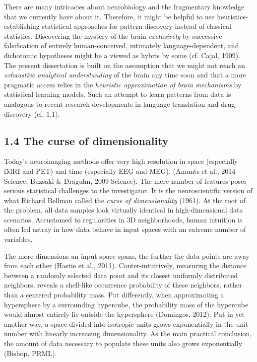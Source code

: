 \documentclass[authoryear,review,3p]{elsarticle}
\begin{document}
There are many intricacies about neurobiology and 
the fragmentary knowledge that we currently have about it.
Therefore, it might be helpful to use heuristics-establishing
statistical approaches for pattern discovery instead of
classical statistics.
%
Discovering the mystery of the brain \textit{exclusively} by
successive falsification of
entirely human-conceived,
intimately language-dependent,
and dichotomic hypotheses
might be a viewed as hybris by some (cf. Cajal, 1909).
%
The present dissertation is built on the assumption that
we might not reach an \textit{exhaustive analytical understanding}
of the brain any time soon
and that a more pragmatic access relies in the \textit{heuristic
approximation of brain mechanisms} by statistical learning models.
Such an attempt to learn patterns from data is
analogous to recent research developments in
language translation and drug discovery (cf. 1.1).



\subsection*{1.4 The curse of dimensionality}

Today's neuroimaging methods offer very high resolution in
space (especially fMRI and PET)
and
time (especially EEG and MEG).
(Amunts et al., 2014 Science; Buzsaki \& Draguhn, 2009 Science).
%
The mere number of features poses serious
statistical challenges to the investigator.
It is the neuroscientific version of what Richard Bellman
called the \textit{curse of dimensionality} (1961).
%
At the root of the problem,
all data samples look virtually identical
in high-dimensional data scenarios.
%
Accustomed to regularities in 3D neighborhoods,
human intuition is often led astray in
how data behave in
input spaces with an extreme number of variables.



The more dimensions an input space spans,
the further the data points are away from each other
(Hastie et al., 2011).
Conter-intuitively,
measuring the distance between a randomly selected data point
and its closest uniformly distributed neighbors,
reveals a shell-like occurrence probability of
these neighbors, rather than a centered probability mass.
%
Put differently,
when approximating a hypersphere by a surrounding hypercube,
the probability mass of the hypercube
would almost entirely lie outside the hypersphere
(Domingos, 2012).
%
Put in yet another way,
a space divided into isotropic units grows exponentially in the
unit number with linearly increasing dimensionality.
As the main practical conclusion,
the amount of data necessary to populate these units
also grows exponentially
(Bishop, PRML).
\end{document}
